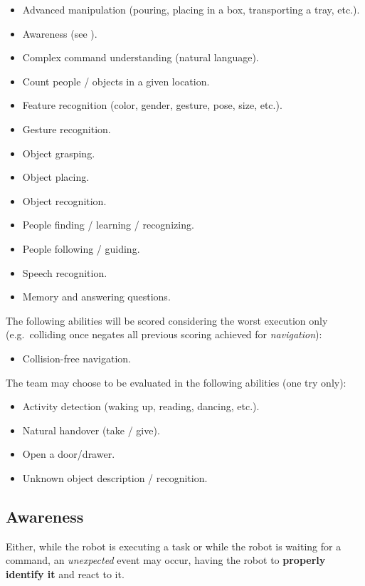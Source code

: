 \begin{itemize}
	\item Advanced manipulation (pouring, placing in a box, transporting a tray, etc.).
	\item Awareness (see ).
	\item Complex command understanding (natural language).
	\item Count people / objects in a given location.
	\item Feature recognition (color, gender, gesture, pose, size, etc.).
	\item Gesture recognition.
	\item Object grasping.
	\item Object placing.
	\item Object recognition.
	\item People finding / learning / recognizing.
	\item People following / guiding.
	\item Speech recognition.
	\item Memory and answering questions.
\end{itemize}

The following abilities will be scored considering the worst execution only (e.g.~colliding once negates all previous scoring achieved for \textit{navigation}):

\begin{itemize}
	\item Collision-free navigation.
\end{itemize}


The team may choose to be evaluated in the following abilities (one try only):
\begin{itemize}
	\item Activity detection (waking up, reading, dancing, etc.).
	\item Natural handover (take / give).
	\item Open a door/drawer.
	\item Unknown object description / recognition.
\end{itemize}

\subsection{Awareness}
\label{sec:eegpsr-awarenes}
Either, while the robot is executing a task or while the robot is waiting for a command, an \textit{unexpected} event may occur, having the robot to \textbf{properly identify it} and react to it.

